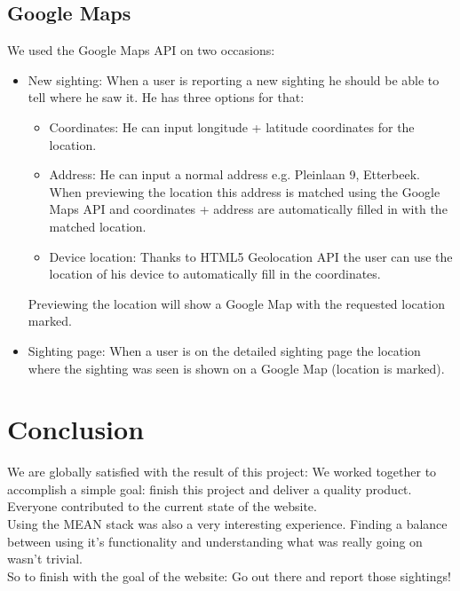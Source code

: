 \documentclass{article}
\begin{document}
\subsection{Google Maps}
We used the Google Maps API on two occasions:
\begin{itemize}
\item New sighting: When a user is reporting a new sighting he should be able to tell where he saw it. He has three options for that:
\begin{itemize}
\item Coordinates: He can input longitude + latitude coordinates for the location.
\item Address: He can input a normal address e.g. Pleinlaan 9, Etterbeek. When previewing the location this address is matched using the Google Maps API and coordinates + address are automatically filled in with the matched location.
\item Device location: Thanks to HTML5 Geolocation API the user can use the location of his device to automatically fill in the coordinates.
\end{itemize}
Previewing the location will show a Google Map with the requested location marked.
\item Sighting page: When a user is on the detailed sighting page the location where the sighting was seen is shown on a Google Map (location is marked).
\end{itemize}

\section{Conclusion}
We are globally satisfied with the result of this project: We worked together to accomplish a simple goal: finish this project and deliver a quality product. Everyone contributed to the current state of the website. \\

Using the MEAN stack was also a very interesting experience. Finding a balance between using it's functionality and understanding what was really going on wasn't trivial. \\

So to finish with the goal of the website: Go out there and report those sightings!
\end{document}
